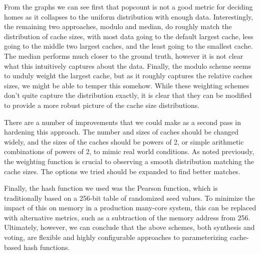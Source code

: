 From the graphs we can see first that popcount is not a good metric for deciding
homes as it collapses to the uniform distribution with enough data.
Interestingly, the remaining two approaches, modulo and median, do roughly match
the distribution of cache sizes, with most data going to the default largest
cache, less going to the middle two largest caches, and the least going to the
smallest cache.  The median performs much closer to the ground truth, however it
is not clear what this intuitively captures about the data.  Finally, the modulo
scheme seems to unduly weight the largest cache, but as it roughly captures the
relative caches sizes, we might be able to temper this somehow.  While these
weighting schemes don't quite capture the distribution exactly, it is clear that
they can be modified to provide a more robust picture of the cache size
distributions.

There are a number of improvements that we could make as a second pass in
hardening this approach.  The number and sizes of caches should be changed
widely, and the sizes of the caches should be powers of 2, or simple arithmetic
combinations of powers of 2, to mimic real world conditions. As noted
previously, the weighting function is crucial to observing a smooth distribution
matching the cache sizes.  The options we tried should be expanded to find
better matches.

Finally, the hash function we used was the Pearson function, which is
traditionally based on a 256-bit table of randomized seed values.  To minimize
the impact of this on memory in a production many-core system, this can be
replaced with alternative metrics, such as a subtraction of the memory address
from 256. Ultimately, however, we can conclude that the above schemes, both
synthesis and voting, are flexible and highly configurable approaches to
parameterizing cache-based hash functions.
